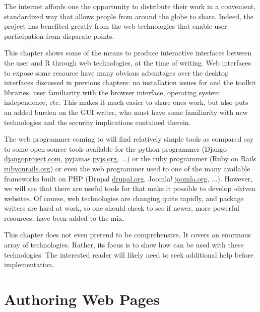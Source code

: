 


The internet affords one the opportunity to distribute their work in a convenient,
standardized way that allows people from around the globe to
share. Indeed, the \R\/ project has benefited greatly from the  web technologies
that enable user participation from disparate points.

This chapter shows some of the means to produce interactive interfaces
between the user and R through web technologies, at the time of
writing. Web interfaces to expose some resource have many obvious advantages
over the desktop interfaces discussed in previous chapters: no
installation issues for \R\/ and the toolkit libraries, user
familiarity with the browser interface, operating system independence, etc. This
makes it much easier to share ones work, but also puts an added burden
on the GUI writer, who must have some familiarity with new
technologies and the security implications contained therein. 

The web programmer coming to \R\/ will find relatively simple tools as
compared say to some open-source tools available for the python
programmer (Django \url{djangoproject.com}, pyjamas \url{pyjs.org},
...) or the ruby programmer (Ruby on Rails \url{rubyonrails.org}) or
even the web programmer used to one of the many available frameworks
built on PHP (Drupal \url{drupal.org}, Joomla! \url{joomla.org},
...). However, we will see that there are useful tools for \R\/ that
make it possible to develop \R-driven websites. Of course, web
technologies are changing quite rapidly, and \R\/ package writers are
hard at work, so one should check to see if newer, more powerful
resources, have been added to the mix.

This chapter does not even pretend to be comprehensive. It covers an
enormous array of technologies. Rather, its focus is to show how \R\/
can be used with these technologies. The interested reader will likely
need to seek additional help before implementation.


\section{Authoring Web Pages}
\label{sec:authoring-web-pages}




